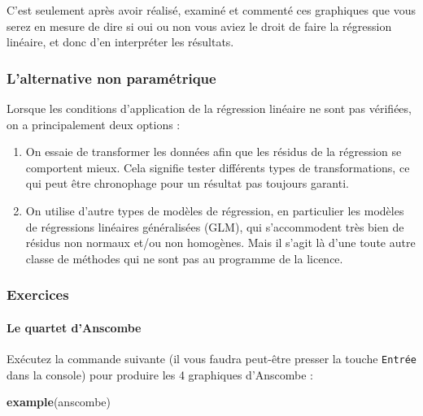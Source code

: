 \documentclass[a4paperpaper,]{article}
\newenvironment{Shaded}{\begin{snugshade}}{\end{snugshade}}
\newcommand{\KeywordTok}[1]{\textcolor[rgb]{0.12,0.11,0.11}{\textbf{#1}}}
\newcommand{\NormalTok}[1]{\textcolor[rgb]{0.12,0.11,0.11}{#1}}
\providecommand{\tightlist}{%
  \setlength{\itemsep}{0pt}\setlength{\parskip}{0pt}}
\let\oldparagraph\paragraph
\renewcommand{\paragraph}[1]{\oldparagraph{#1}\mbox{}}
\begin{document}
C'est seulement après avoir réalisé, examiné et commenté ces graphiques que vous serez en mesure de dire si oui ou non vous aviez le droit de faire la régression linéaire, et donc d'en interpréter les résultats.

\hypertarget{lalternative-non-paramuxe9trique-5}{%
\subsubsection{L'alternative non paramétrique}\label{lalternative-non-paramuxe9trique-5}}

Lorsque les conditions d'application de la régression linéaire ne sont pas vérifiées, on a principalement deux options :

\begin{enumerate}
\def\labelenumi{\arabic{enumi}.}
\tightlist
\item
  On essaie de transformer les données afin que les résidus de la régression se comportent mieux. Cela signifie tester différents types de transformations, ce qui peut être chronophage pour un résultat pas toujours garanti.
\item
  On utilise d'autre types de modèles de régression, en particulier les modèles de régressions linéaires généralisées (GLM), qui s'accommodent très bien de résidus non normaux et/ou non homogènes. Mais il s'agit là d'une toute autre classe de méthodes qui ne sont pas au programme de la licence.
\end{enumerate}

\hypertarget{exercices-1}{%
\subsubsection{Exercices}\label{exercices-1}}

\hypertarget{le-quartet-danscombe}{%
\paragraph{Le quartet d'Anscombe}\label{le-quartet-danscombe}}

Exécutez la commande suivante (il vous faudra peut-être presser la touche \texttt{Entrée} dans la console) pour produire les 4 graphiques d'Anscombe :

\begin{Shaded}
\begin{Highlighting}[]
\KeywordTok{example}\NormalTok{(anscombe)}
\end{Highlighting}
\end{Shaded}
\end{document}
